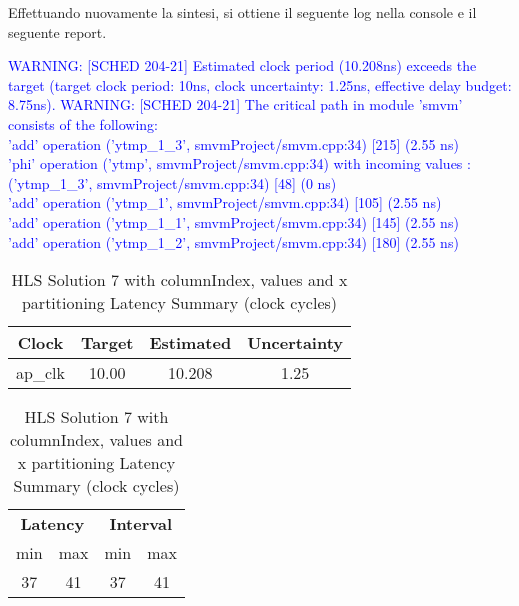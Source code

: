 

Effettuando nuovamente la sintesi, si ottiene il seguente log nella console e il seguente report.

\textcolor{blue}{WARNING: [SCHED 204-21] Estimated clock period (10.208ns) exceeds the target (target clock period: 10ns, clock uncertainty: 1.25ns, effective delay budget: 8.75ns).}
\textcolor{blue}{WARNING: [SCHED 204-21] The critical path in module 'smvm' consists of the following:}
\\
\textcolor{blue}{'add' operation ('ytmp\_1\_3', smvmProject/smvm.cpp:34) [215]  (2.55 ns)}
\\
\textcolor{blue}{'phi' operation ('ytmp', smvmProject/smvm.cpp:34) with incoming values : ('ytmp\_1\_3', smvmProject/smvm.cpp:34) [48]  (0 ns)}
\\
\textcolor{blue}{'add' operation ('ytmp\_1', smvmProject/smvm.cpp:34) [105]  (2.55 ns)}
\\
\textcolor{blue}{'add' operation ('ytmp\_1\_1', smvmProject/smvm.cpp:34) [145]  (2.55 ns)}
\\
\textcolor{blue}{'add' operation ('ytmp\_1\_2', smvmProject/smvm.cpp:34) [180]  (2.55 ns)}

\begin{table}[H]
	\centering
	\begin{minipage}[t]{0.45\linewidth}
		\centering
		\begin{tabular}{|c|c|c|c|}
			\hline
			\textbf{Clock} & \textbf{Target} & \textbf{Estimated} & \textbf{Uncertainty} \\
			\hline
			ap\_clk & 10.00 & 10.208 & 1.25 \\
			\hline
		\end{tabular}
		\caption{HLS Solution 7 with columnIndex, values and x partitioning Timing Summary (ns)}
		\label{tab:hls-solution-7-columnindex-values-x-partitioning-timing-summary}
	\end{minipage}
	\hfill
	\begin{minipage}[t]{0.45\linewidth}
		\centering
		\begin{tabular}{|c|c|c|c|}
			\hline
			\multicolumn{2}{|c|}{\textbf{Latency}} & \multicolumn{2}{|c|}{\textbf{Interval}} \\
			min & max & min & max \\
			\hline
			37 & 41 & 37 & 41 \\
			\hline
		\end{tabular}
		\caption{HLS Solution 7 with columnIndex, values and x partitioning Latency Summary (clock cycles)}
		\label{tab:hls-solution-7-columnindex-values-x-partitioning-latency-summary}
	\end{minipage}
\end{table}

